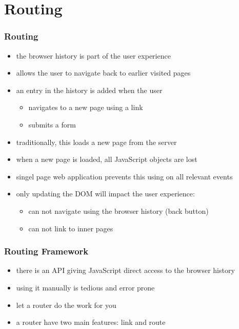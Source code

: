 \section{Routing}
\begin{frame}[fragile] \frametitle{Routing}
\begin{itemize}
  \item the browser history is part of the user experience
  \item allows the user to navigate back to earlier visited pages
  \item an entry in the history is added when the user
  \begin{itemize}
    \item navigates to a new page using a link
    \item submits a form
  \end{itemize}
  \item traditionally, this loads a new page from the server
  \item when a new page is loaded, all JavaScript objects are lost
  \item singel page web application prevents this using  on all relevant events
  \item only updating the DOM will impact the user experience:
  \begin{itemize}
    \item can not navigate using the browser history (back button)
    \item can not link to inner pages
  \end{itemize}
\end{itemize}
\end{frame}

\begin{frame}[fragile] \frametitle{Routing Framework}
\begin{itemize}
  \item there is an API giving JavaScript direct access to the browser history
  \item using it manually is tedious and error prone
  \item let a router do the work for you
  \item a router have two main features: link and route
\end{itemize}

\vspace{10mm}
\end{frame}

